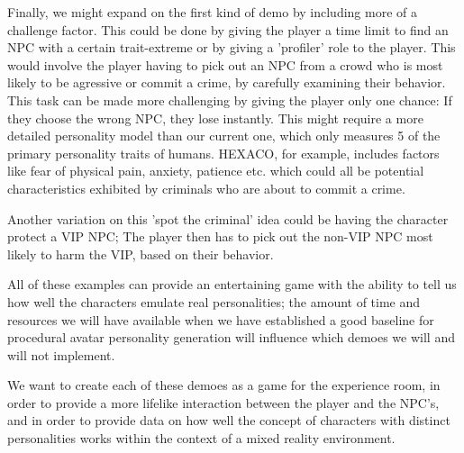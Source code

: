 \documentclass{article}
\begin{document}
Finally, we might expand on the first kind of demo by including more of a challenge factor. This could be done by giving the player a time limit to find an NPC with a certain trait-extreme or by giving a 'profiler' role to the player. This would involve the player having to pick out an NPC from a crowd who is most likely to be agressive or commit a crime, by carefully examining their behavior. This task can be made more challenging by giving the player only one chance: If they choose the wrong NPC, they lose instantly. This might require a more detailed personality model than our current one, which only measures 5 of the primary personality traits of humans. HEXACO, for example, includes factors like fear of physical pain, anxiety, patience etc. which could all be potential characteristics exhibited by criminals who are about to commit a crime.

Another variation on this 'spot the criminal'  idea could be having the character protect a VIP NPC; The player then has to pick out the non-VIP NPC most likely to harm the VIP, based on their behavior. 

All of these examples can provide an entertaining game with the ability to tell us how well the characters emulate real personalities; the amount of time and resources we will have available when we have established a good baseline for procedural avatar personality generation will influence which demoes we will and will not implement.

We want to create each of these demoes as a game for the experience room, in order to provide a more lifelike interaction between the player and the NPC's, and in order to provide data on how well the concept of characters with distinct personalities works within the context of a mixed reality environment. 





\end{document}
